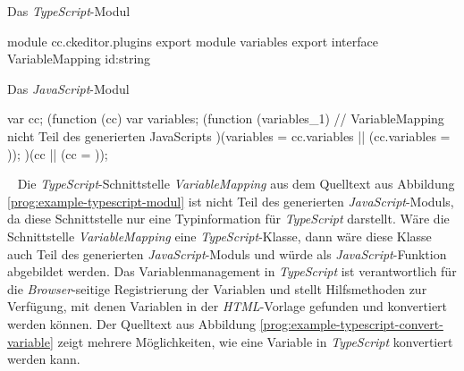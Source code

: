 \begin{program}[h]
\caption{Das \emph{TypeScript}-Modul}
\label{prog:example-typescript-modul}
\begin{JsCode}[numbers=none]
module cc.ckeditor.plugins {
	export module variables {
		export interface VariableMapping{
	        id:string
		}
	}
}                  
\end{JsCode}
\end{program}

\begin{program}[h]
\caption{Das \emph{JavaScript}-Modul}
\label{prog:example-javascript-modul}
\begin{JsCode}[numbers=none]
var cc;
(function (cc) {
    var variables;
    (function (variables_1) {
    // VariableMapping nicht Teil des generierten JavaScripts
    })(variables = cc.variables || (cc.variables = {}));
})(cc || (cc = {}));                 
\end{JsCode}
\end{program}
\ \newline
Die \emph{TypeScript}-Schnittstelle \emph{VariableMapping} aus dem Quelltext aus Abbildung \ref{prog:example-typescript-modul} ist nicht Teil des generierten \emph{JavaScript}-Moduls, da diese Schnittstelle nur eine Typinformation für \emph{TypeScript} darstellt. Wäre die Schnittstelle \emph{VariableMapping} eine \emph{TypeScript}-Klasse, dann wäre diese Klasse auch Teil des generierten \emph{JavaScript}-Moduls und würde als \emph{JavaScript}-Funktion abgebildet werden.
\newline
\newline
Das Variablenmanagement in \emph{TypeScript} ist verantwortlich für die \emph{Browser}-seitige Registrierung der Variablen und stellt Hilfsmethoden zur Verfügung, mit denen Variablen in der \emph{HTML}-Vorlage gefunden und konvertiert werden können. Der Quelltext aus Abbildung \ref{prog:example-typescript-convert-variable} zeigt mehrere Möglichkeiten, wie eine Variable in \emph{TypeScript} konvertiert werden kann.
\newpage

